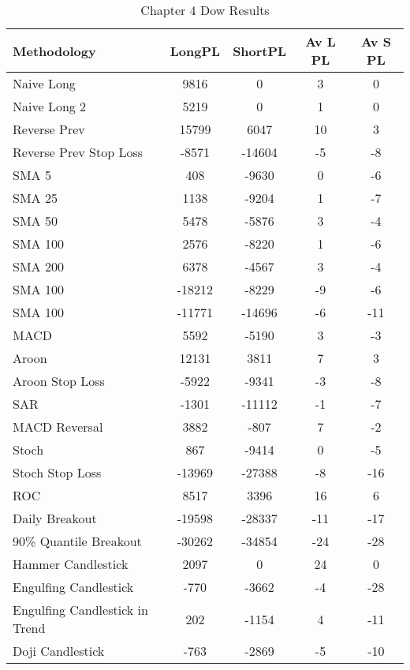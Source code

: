 \begin{table}[ht]
\centering
\caption[Chapter 4 Dow Results]{Chapter 4 Dow Results} 
\label{tab:chp6:dow_summary}
\begin{tabular}{lcccc}
  \toprule Methodology & LongPL & ShortPL & Av L PL & Av S PL \\ 
  \midrule Naive Long & 9816 & 0 & 3 & 0 \\ 
  Naive Long 2 & 5219 & 0 & 1 & 0 \\ 
  Reverse Prev & 15799 & 6047 & 10 & 3 \\ 
  Reverse Prev Stop Loss & -8571 & -14604 & -5 & -8 \\ 
  SMA 5 & 408 & -9630 & 0 & -6 \\ 
  SMA 25 & 1138 & -9204 & 1 & -7 \\ 
  SMA 50 & 5478 & -5876 & 3 & -4 \\ 
  SMA 100 & 2576 & -8220 & 1 & -6 \\ 
  SMA 200 & 6378 & -4567 & 3 & -4 \\ 
  SMA 100 & -18212 & -8229 & -9 & -6 \\ 
  SMA 100 & -11771 & -14696 & -6 & -11 \\ 
  MACD & 5592 & -5190 & 3 & -3 \\ 
  Aroon & 12131 & 3811 & 7 & 3 \\ 
  Aroon Stop Loss & -5922 & -9341 & -3 & -8 \\ 
  SAR & -1301 & -11112 & -1 & -7 \\ 
  MACD Reversal & 3882 & -807 & 7 & -2 \\ 
  Stoch & 867 & -9414 & 0 & -5 \\ 
  Stoch Stop Loss & -13969 & -27388 & -8 & -16 \\ 
  ROC & 8517 & 3396 & 16 & 6 \\ 
  Daily Breakout & -19598 & -28337 & -11 & -17 \\ 
  90\% Quantile Breakout & -30262 & -34854 & -24 & -28 \\ 
  Hammer Candlestick & 2097 & 0 & 24 & 0 \\ 
  Engulfing Candlestick & -770 & -3662 & -4 & -28 \\ 
  Engulfing Candlestick in Trend & 202 & -1154 & 4 & -11 \\ 
  Doji Candlestick & -763 & -2869 & -5 & -10 \\ 
   \bottomrule \end{tabular}
\end{table}
